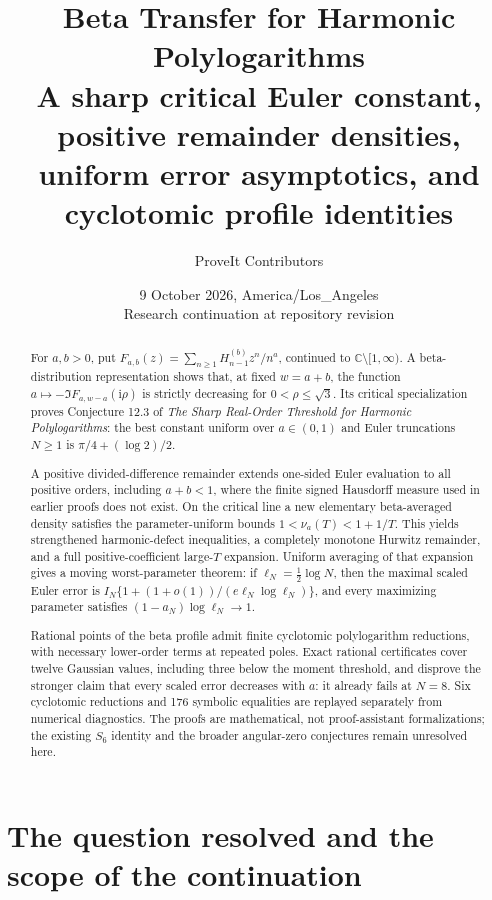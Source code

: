 \documentclass[11pt]{article}
\title{\textbf{Beta Transfer for Harmonic Polylogarithms}\\[9pt]
\large A sharp critical Euler constant, positive remainder densities,\\
uniform error asymptotics, and cyclotomic profile identities}
\author{ProveIt Contributors}
\date{9 October 2026, America/Los\_Angeles\\[3pt]
\small Research continuation at repository revision \pin}
\numberwithin{equation}{section}
\theoremstyle{definition}\newtheorem{definition}[theorem]{Definition}
\theoremstyle{remark}\newtheorem{remark}[theorem]{Remark}
\newcommand{\ii}{\mathrm i}
\newcommand{\C}{\mathbb C}
\begin{document}
\maketitle\thispagestyle{empty}
\begin{abstract}
For $a,b>0$, put $F_{a,b}(z)=\sum_{n\ge1}H_{n-1}^{(b)}z^n/n^a$,
continued to $\C\setminus[1,\infty)$. A beta-distribution representation
shows that, at fixed $w=a+b$, the function
$a\mapsto-\Im F_{a,w-a}(\ii\rho)$ is strictly decreasing for
$0<\rho\le\sqrt3$. Its critical specialization proves Conjecture 12.3 of
\emph{The Sharp Real-Order Threshold for Harmonic Polylogarithms}:
the best constant uniform over $a\in(0,1)$ and Euler truncations $N\ge1$ is
$\pi/4+(\log2)/2$.

A positive divided-difference remainder extends one-sided Euler
evaluation to all positive orders, including $a+b<1$, where the finite
signed Hausdorff measure used in earlier proofs does not exist. On the
critical line a new elementary beta-averaged density satisfies the
parameter-uniform bounds $1<\nu_a(T)<1+1/T$. This yields strengthened
harmonic-defect inequalities, a completely monotone Hurwitz remainder,
and a full positive-coefficient large-$T$ expansion. Uniform averaging
of that expansion gives a moving worst-parameter theorem:
if $\ell_N=\tfrac12\log N$, then the maximal scaled Euler error is
$I_N\{1+(1+o(1))/(e\ell_N\log\ell_N)\}$, and every maximizing parameter satisfies
$(1-a_N)\log\ell_N\to1$.

Rational points of the beta profile admit finite cyclotomic
polylogarithm reductions, with necessary lower-order terms at repeated
poles. Exact rational certificates cover twelve Gaussian values,
including three below the moment threshold, and disprove the stronger
claim that every scaled error decreases with $a$: it already fails at
$N=8$. Six cyclotomic reductions and 176 symbolic equalities are replayed
separately from numerical diagnostics. The proofs are mathematical,
not proof-assistant formalizations; the existing $S_6$ identity and the
broader angular-zero conjectures remain unresolved here.
\end{abstract}
\clearpage
\begingroup\small
\setlength{\parskip}{0pt}
\tableofcontents
\endgroup
\clearpage

\section{The question resolved and the scope of the continuation}
\label{sec:scope}
\end{document}

